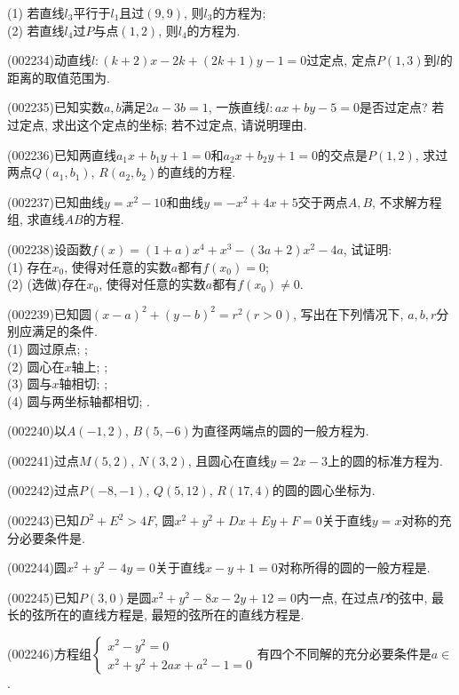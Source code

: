 (1) 若直线${{l}_{3}}$平行于${{l}_{1}}$且过$(9,9)$, 则${{l}_{3}}$的方程为;\\ 
(2) 若直线${{l}_{4}}$过$P$与点$(1,2)$, 则${{l}_{4}}$的方程为.
\item (002234)动直线$l: (k+2)x-2k+(2k+1)y-1=0$过定点, 定点$P(1,3)$到$l$的距离的取值范围为.
\item (002235)已知实数$a,b$满足$2a-3b=1$, 一族直线$l:ax+by-5=0$是否过定点? 若过定点, 求出这个定点的坐标; 若不过定点, 请说明理由.
\item (002236)已知两直线$a_1x+b_1y+1=0$和$a_2x+b_2y+1=0$的交点是$P(1,2)$, 求过两点$Q(a_1,b_1)$, $R(a_2,b_2)$的直线的方程.
\item (002237)已知曲线$y=x^2-10$和曲线$y=-x^2+4x+5$交于两点$A,B$, 不求解方程组, 求直线$AB$的方程.
\item (002238)设函数$f(x)=(1+a){{x}^{4}}+{{x}^{3}}-(3a+2){{x}^{2}}-4a$, 试证明:\\ 
(1) 存在${{x}_{0}}$, 使得对任意的实数$a$都有$f({{x}_{0}})=0$;\\ 
(2) (选做)存在${{x}_{0}}$, 使得对任意的实数$a$都有$f({{x}_{0}})\ne 0$.
\item (002239)已知圆$(x-a)^2+(y-b)^2=r^2(r>0)$, 写出在下列情况下, $a,b,r$分别应满足的条件.\\ 
(1) 圆过原点; ;\\ 
(2) 圆心在$x$轴上; ;\\ 
(3) 圆与$x$轴相切; ;\\ 
(4) 圆与两坐标轴都相切; .
\item (002240)以$A(-1,2)$, $B(5,-6)$为直径两端点的圆的一般方程为.
\item (002241)过点$M(5,2)$, $N(3,2)$, 且圆心在直线$y=2x-3$上的圆的标准方程为.
\item (002242)过点$P(-8,-1)$, $Q(5,12)$, $R(17,4)$的圆的圆心坐标为.
\item (002243)已知$D^2+E^2>4F$, 圆$x^2+y^2+Dx+Ey+F=0$关于直线$y=x$对称的充分必要条件是.
\item (002244)圆$x^2+y^2-4y=0$关于直线$x-y+1=0$对称所得的圆的一般方程是.
\item (002245)已知$P(3,0)$是圆$x^2+y^2-8x-2y+12=0$内一点, 在过点$P$的弦中, 最长的弦所在的直线方程是, 最短的弦所在的直线方程是.
\item (002246)方程组$\left\{\begin{array}{l}x^2-y^2=0\\x^2+y^2+2ax+a^2-1=0\end{array}\right.$有四个不同解的充分必要条件是$a\in$.
